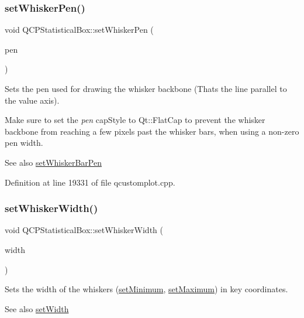 \subsubsection{\texorpdfstring{set\+Whisker\+Pen()}{setWhiskerPen()}}
{\footnotesize\ttfamily void Q\+C\+P\+Statistical\+Box\+::set\+Whisker\+Pen (\begin{DoxyParamCaption}\item[{const Q\+Pen \&}]{pen }\end{DoxyParamCaption})}

Sets the pen used for drawing the whisker backbone (That\textquotesingle{}s the line parallel to the value axis).

Make sure to set the {\itshape pen} cap\+Style to Qt\+::\+Flat\+Cap to prevent the whisker backbone from reaching a few pixels past the whisker bars, when using a non-\/zero pen width.

\begin{DoxySeeAlso}{See also}
\hyperlink{class_q_c_p_statistical_box_aa8d3e503897788e1abf68dc74b5f147f}{set\+Whisker\+Bar\+Pen} 
\end{DoxySeeAlso}


Definition at line 19331 of file qcustomplot.\+cpp.

\mbox{\label{class_q_c_p_statistical_box_adf378812446bd66f34d1f7f293d991cd}} 
\subsubsection{\texorpdfstring{set\+Whisker\+Width()}{setWhiskerWidth()}}
{\footnotesize\ttfamily void Q\+C\+P\+Statistical\+Box\+::set\+Whisker\+Width (\begin{DoxyParamCaption}\item[{double}]{width }\end{DoxyParamCaption})}

Sets the width of the whiskers (\hyperlink{class_q_c_p_statistical_box_a84ff7cc61ba44890f0c3e0c99c19941e}{set\+Minimum}, \hyperlink{class_q_c_p_statistical_box_acec5ad1901f00f2c5387cfb4d9787eb3}{set\+Maximum}) in key coordinates.

\begin{DoxySeeAlso}{See also}
\hyperlink{class_q_c_p_statistical_box_a0b62775bd67301b1eba5c785f2b26f14}{set\+Width} 
\end{DoxySeeAlso}


